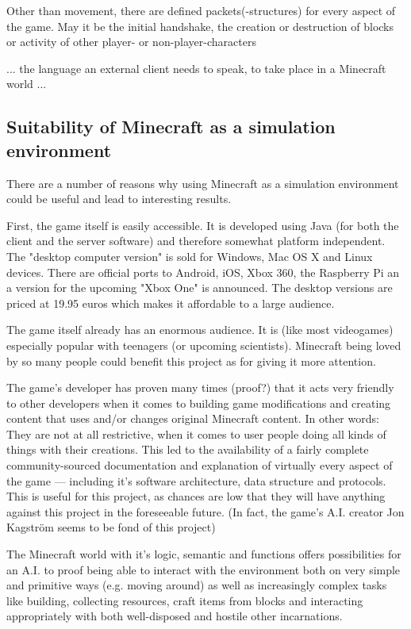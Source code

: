 Other than movement, there are defined packets(-structures) for every aspect of the game. May it be the initial handshake, the creation or destruction of blocks or activity of other player- or non-player-characters

... the language an external client needs to speak, to take place in a Minecraft world ...

        \subsection{Suitability of Minecraft as a simulation environment}
There are a number of reasons why using Minecraft as a simulation environment could be useful and lead to interesting results.

First, the game itself is easily accessible. It is developed using Java (for both the client and the server software) and therefore somewhat platform independent. The "desktop computer version" is sold for Windows, Mac OS X and Linux devices. There are official ports to Android, iOS, Xbox 360, the Raspberry Pi an a version for the upcoming "Xbox One" is announced. The desktop versions are priced at 19.95 euros  which makes it affordable to a large audience.

The game itself already has an enormous audience. It is (like most videogames) especially popular with teenagers (or upcoming scientists). Minecraft being loved by so many people could benefit this project as for giving it more attention.

The game's developer has proven many times (proof?) that it acts very friendly to other developers when it comes to building game modifications and creating content that uses and/or changes original Minecraft content. In other words: They are not at all restrictive, when it comes to user people doing all kinds of things with their creations. This led to the availability of a fairly complete community-sourced  documentation and explanation of virtually every aspect of the game --- including it's software architecture, data structure and protocols. This is useful for this project, as chances are low that they will have anything against this project in the foreseeable future. (In fact, the game's A.I. creator Jon Kagström seems to be fond of this project)

The Minecraft world with it's logic, semantic and functions offers possibilities for an A.I. to proof being able to interact with the environment both on very simple and primitive ways (e.g. moving around) as well as increasingly complex tasks like building, collecting resources, craft items from blocks and interacting appropriately with both well-disposed and hostile other incarnations. %

